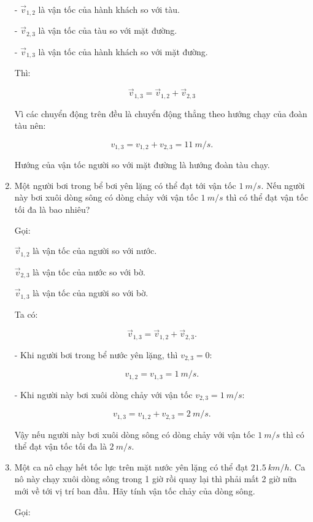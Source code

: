 \begin{enumerate}[label=\bfseries Bài \arabic*:]
{\begin{enumerate}[label=\alph*)]
			- $\vec v_{1,2}$ là vận tốc của hành khách so với tàu.
			
			- $\vec v_{2,3}$ là vận tốc của tàu so với mặt đường.
			
			- $\vec v_{1,3}$ là vận tốc của hành khách so với mặt đường.
			
			Thì:
			
			$$\vec v_{1,3} = \vec v_{1,2} + \vec v_{2,3}$$
			
			Vì các chuyển động trên đều là chuyển động thẳng theo hướng chạy của đoàn tàu nên:
			
			$$v_{1,3} = v_{1,2} + v_{2,3} = \SI{11}{m/s}.$$
			
			Hướng của vận tốc người so với mặt đường là hướng đoàn tàu chạy.
		\end{enumerate}
	}

	\item {}
	
	
	{
		Một người bơi trong bể bơi yên lặng có thể đạt tới vận tốc $\SI{1}{m/s}$. Nếu người này bơi xuôi dòng sông có dòng chảy với vận tốc $\SI{1}{m/s}$ thì có thể đạt vận tốc tối đa là bao nhiêu?
	}
	\hideall
	{
		Gọi:
		
		$\vec v_{1,2}$ là vận tốc của người so với nước.
		
		$\vec v_{2,3}$ là vận tốc của nước so với bờ.
		
		$\vec v_{1,3}$ là vận tốc của người so với bờ.
		
		Ta có:
		
		$$\vec v_{1,3} = \vec v_{1,2} + \vec v_{2,3}.$$
		
		- Khi người bơi trong bể nước yên lặng, thì $v_{2,3} = 0$:
		
		$$v_{1,2} = v_{1,3} = \SI{1}{m/s}.$$
		
		- Khi người này bơi xuôi dòng chảy với vận tốc $v_{2,3} = \SI{1}{m/s}$:
		
		
		$$v_{1,3} = v_{1,2} + v_{2,3} = \SI{2}{m/s}.$$
		
		Vậy nếu người này bơi xuôi dòng sông có dòng chảy với vận tốc $\SI{1}{m/s}$ thì có thể đạt vận tốc tối đa là $\SI{2}{m/s}.$
		
		
	}
	\item {}
	
	
	{
		Một ca nô chạy hết tốc lực trên mặt nước yên lặng có thể đạt $\SI{21,5}{km/h}$. Ca nô này chạy xuôi dòng sông trong 1 giờ rồi quay lại thì phải mất 2 giờ nữa mới về tới vị trí ban đầu. Hãy tính vận tốc chảy của dòng sông.
	}
	\hideall
	{
		Gọi:
		
}
\end{enumerate}
